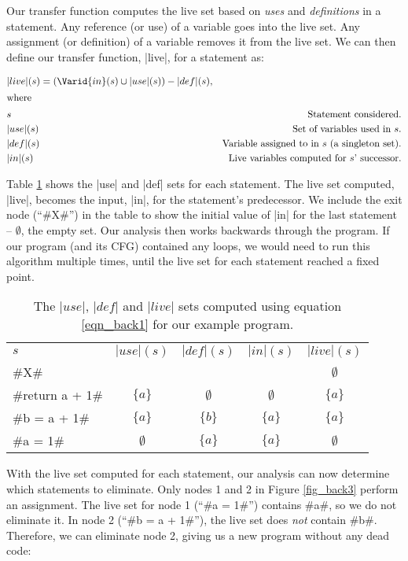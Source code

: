\documentclass[12pt]{report}
\begin{document}
Our transfer function computes the live set based on \emph{uses} and
\emph{definitions} in a statement. Any reference (or use) of a
variable goes into the live set. Any assignment (or definition) of a
variable removes it from the live set. We can then define our transfer
function, |live|, for a statement as:

\begin{align}
  & |live|(s) = (\Varid{in}(s) \cup |use|(s)) - |def|(s), \label{eqn_back1} \\
\intertext{where}
  & s     & \text{Statement considered.} \notag\\
  & |use|(s) &  \text{Set of variables used in $s$}. \notag\\
  & |def|(s) & \text{Variable assigned to in $s$ (a singleton set)}. \notag\\
  & |in|(s) & \text{Live variables computed for $s$' successor}. \notag
\end{align}

Table \ref{tbl_back1} shows the |use| and |def| sets for each
statement. The live set computed, |live|, becomes the input, |in|, for
the statement's predecessor. We include the exit node (``#X#'') in the
table to show the initial value of |in| for the last statement --
$\emptyset$, the empty set. Our analysis then works backwards through the
program. If our program (and its CFG) contained any loops, we would
need to run this algorithm multiple times, until the live set for each
statement reached a fixed point.

\begin{table}
  \centering
  \begin{tabular}{lcccc}
    $s$ & $|use|(s)$ & $|def|(s)$ & $|in|(s)$ &  $|live|(s)$ \\
    \cmidrule(r){1-1}\cmidrule(r){2-2}\cmidrule(r){3-3}\cmidrule(r){4-4}\cmidrule(r){5-5}
    #X# & & & & $\emptyset$ \\
    #return a + 1# & $\{a\}$ & $\emptyset$ & $\emptyset$ & $\{a\}$ \\
    #b = a + 1# & $\{a\}$ & $\{b\}$ & $\{a\}$ & $\{a\}$ \\
    #a = 1# & $\emptyset$ & $\{a\}$ & $\{a\}$ & $\emptyset$ \\
    \bottomrule
  \end{tabular}
  \caption{The $|use|$, $|def|$ and $|live|$ sets computed using equation \ref{eqn_back1} for our example program.}
  \label{tbl_back1}
\end{table}

With the live set computed for each statement, our analysis can now
determine which statements to eliminate. Only nodes 1 and 2 in Figure
\ref{fig_back3} perform an assignment. The live set for node 1 (``#a = 1#'')
contains #a#, so we do not eliminate it. In node 2 (``#b = a + 1#''),
the live set does \emph{not} contain #b#. Therefore, we can eliminate
node 2, giving us a new program without any dead code:
\end{document}
